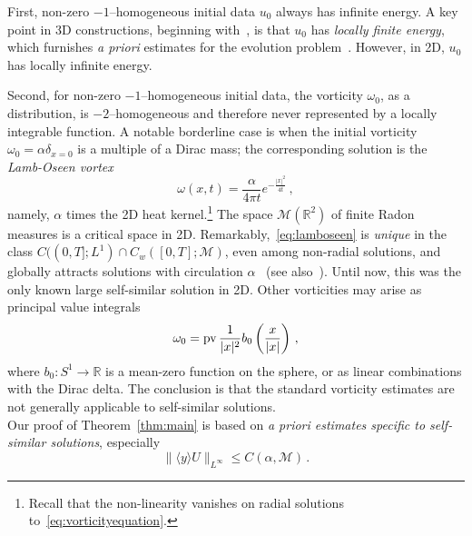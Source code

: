 \documentclass[12pt,reqno]{amsart}
\theoremstyle{plain}
\theoremstyle{definition}
\newcommand{\R}{\mathbb{R}}
\renewcommand{\:}{\colon}
\numberwithin{equation}{section}
\numberwithin{figure}{section}
\begin{document}
First, non-zero $-1$--homogeneous initial data $u_0$ always has infinite energy. A key point in 3D constructions, beginning with~\cite{jiasverakselfsim}, is that $u_0$ has \emph{locally finite energy}, which furnishes \emph{a priori} estimates for the evolution problem~\cite{LemarieRieussetRecentDevelopments}. However, in 2D, $u_0$ has locally infinite energy.

Second, for non-zero $-1$--homogeneous initial data, the vorticity $\omega_0$, as a distribution, is $-2$--homogeneous and therefore never represented by a locally integrable function. A notable borderline case is when the initial vorticity $\omega_0 = \alpha \delta_{x=0}$ is a multiple of a Dirac mass; the corresponding solution is the \emph{Lamb-Oseen vortex}
\begin{equation}
    \label{eq:lamboseen}
    \omega(x,t) = \frac{\alpha}{4 \pi t} e^{-\frac{|x|^2}{4t}} \, , 
\end{equation}
namely, $\alpha$ times the 2D heat kernel.\footnote{Recall that the non-linearity vanishes on radial solutions to~\eqref{eq:vorticityequation}.} The space $\mathcal{M}(\R^2)$ of finite Radon measures is a critical space in 2D. Remarkably,~\eqref{eq:lamboseen} is \emph{unique} in the class $C((0,T];L^1) \cap C_w([0,T];\mathcal{M})$, even among non-radial solutions, and globally attracts solutions with circulation $\alpha$~\cite{GallayWayne} (see also~\cite{GallagherGallay,GallayGallagherLions}). Until now, this was the only known large self-similar solution in 2D. Other vorticities may arise as principal value integrals
\begin{equation}
    \omega_0 = {\rm pv} \, \frac{1}{|x|^2} b_0 \left( \frac{x}{|x|} \right) \, ,
\end{equation}
where $b_0 : S^1 \to \R$ is a mean-zero function on the sphere, or as linear combinations with the Dirac delta. The conclusion is that the standard vorticity estimates are not generally applicable to self-similar solutions. \\


Our proof of Theorem~\ref{thm:main} is based on \emph{a priori estimates specific to self-similar solutions}, especially
\begin{equation}
    \label{eq:aprioriestimateinintro}
\| \langle y \rangle U \|_{L^\infty} \leq C(\alpha,\mathcal{M}) \, .    
\end{equation}
\end{document}
